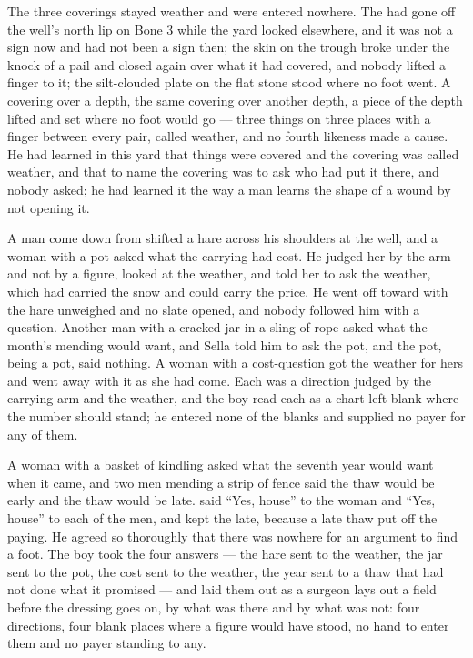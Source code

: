 \scenebreak

The three coverings stayed weather and were entered nowhere. The  had gone off the well's north lip on Bone 3 while the yard looked elsewhere, and it was not a sign now and had not been a sign then; the skin on the trough broke under the knock of a pail and closed again over what it had covered, and nobody lifted a finger to it; the silt-clouded plate on the flat stone stood where no foot went. A covering over a depth, the same covering over another depth, a piece of the depth lifted and set where no foot would go --- three things on three places with a finger between every pair, called weather, and no fourth likeness made a cause. He had learned in this yard that things were covered and the covering was called weather, and that to name the covering was to ask who had put it there, and nobody asked; he had learned it the way a man learns the shape of a wound by not opening it.

A man come down from  shifted a hare across his shoulders at the well, and a woman with a pot asked what the carrying had cost. He judged her by the arm and not by a figure, looked at the weather, and told her to ask the weather, which had carried the snow and could carry the price. He went off toward  with the hare unweighed and no slate opened, and nobody followed him with a question. Another man with a cracked jar in a sling of rope asked what the month's mending would want, and Sella told him to ask the pot, and the pot, being a pot, said nothing. A woman with a cost-question got the weather for hers and went away with it as she had come. Each was a direction judged by the carrying arm and the weather, and the boy read each as a chart left blank where the number should stand; he entered none of the blanks and supplied no payer for any of them.

A woman with a basket of kindling asked what the seventh year would want when it came, and two men mending a strip of fence said the thaw would be early and the thaw would be late.  said “Yes, house” to the woman and “Yes, house” to each of the men, and kept the late, because a late thaw put off the paying. He agreed so thoroughly that there was nowhere for an argument to find a foot. The boy took the four answers --- the hare sent to the weather, the jar sent to the pot, the cost sent to the weather, the year sent to a thaw that had not done what it promised --- and laid them out as a surgeon lays out a field before the dressing goes on, by what was there and by what was not: four directions, four blank places where a figure would have stood, no hand to enter them and no payer standing to any.

